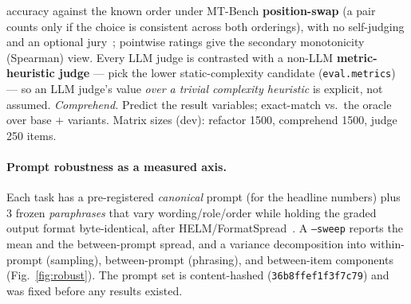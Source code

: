 \documentclass[11pt]{article}
\begin{document}
accuracy against the known order under MT-Bench \textbf{position-swap} (a pair counts
only if the choice is consistent across both orderings), with no self-judging and an
optional jury~\citep{zheng-etal-2023-judging,verga-etal-2024-replacing}; pointwise ratings give the
secondary monotonicity (Spearman) view. Every LLM judge is contrasted with a non-LLM
\textbf{metric-heuristic judge} --- pick the lower static-complexity candidate
(\texttt{eval.metrics}) --- so an LLM judge's value \emph{over a trivial complexity
heuristic} is explicit, not assumed.
\emph{Comprehend.} Predict the result variables; exact-match vs.\ the oracle over base
$+$ variants. Matrix sizes (dev): refactor 1500, comprehend 1500, judge
250 items.

\paragraph{Prompt robustness as a measured axis.} Each task has a pre-registered
\emph{canonical} prompt (for the headline numbers) plus $3$ frozen
\emph{paraphrases} that vary wording/role/order while holding the graded output format
byte-identical, after HELM/FormatSpread~\citep{liang-etal-2023-holistic,sclar-etal-2024-quantifying}. A
\texttt{--sweep} reports the mean and the between-prompt spread, and a variance
decomposition into within-prompt (sampling), between-prompt (phrasing), and
between-item components (Fig.~\ref{fig:robust}). The prompt set is content-hashed
(\texttt{36b8ffef1f3f7c79}) and was fixed before any results existed.
\end{document}
